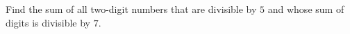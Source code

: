 Find the sum of all two-digit numbers that are divisible by $5$ and whose sum of digits is divisible by $7$.
